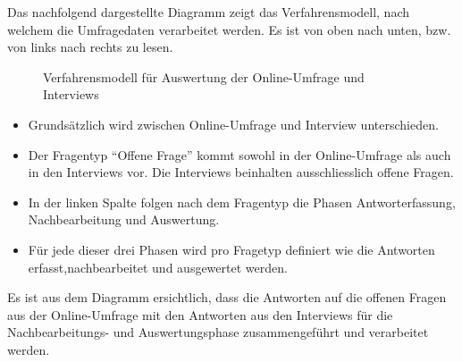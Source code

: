 \documentclass[../../main.tex]{subfiles}
\begin{document}
\begin{sloppypar}
Das nachfolgend dargestellte Diagramm zeigt das Verfahrensmodell, nach welchem die Umfragedaten verarbeitet werden. Es ist von oben nach unten, bzw. von links nach rechts zu lesen.
\end{sloppypar}

\begin{figure}[H]
 \centering
    
 \caption{Verfahrensmodell für Auswertung der Online-Umfrage und Interviews}
 \label{Allgemeines Vorgehen}
\end{figure}

\begin{sloppypar}
\begin{itemize}
  \item Grundsätzlich wird zwischen Online-Umfrage und Interview unterschieden. 
  \item Der Fragentyp "`Offene Frage"' kommt sowohl in der Online-Umfrage \newline als auch in den Interviews vor. Die Interviews beinhalten ausschliesslich offene Fragen.
  \item In der linken Spalte folgen nach dem Fragentyp die Phasen Antworterfassung, \newline Nachbearbeitung und Auswertung. 
  \item Für jede dieser drei Phasen wird pro Fragetyp definiert wie die Antworten erfasst,\newline nachbearbeitet und ausgewertet werden.
\end{itemize}

Es ist aus dem Diagramm ersichtlich, dass die Antworten auf die offenen Fragen aus der Online-Umfrage mit den Antworten aus den Interviews für die Nachbearbeitungs- und Auswertungsphase zusammengeführt und verarbeitet werden.
\end{sloppypar}
\end{document}
